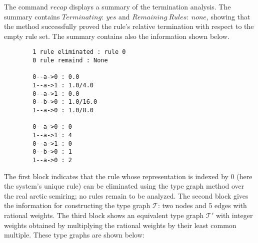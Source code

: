 The command \colorbox{Ivory2}{$recap$} displays a summary of the termination analysis. The summary contains \colorbox{Ivory2}{$Terminating:\ yes$} and \colorbox{Ivory2}{$Remaining\ Rules:\ none$}, showing that the method successfully proved the rule's relative termination with respect to the empty rule set.
The summary contains also the information shown below.
\begin{center}
    \begin{verbatim} 
        1 rule eliminated : rule 0 
        0 rule remaind : None

        0--a->0 : 0.0
        1--a->1 : 1.0/4.0 
        0--a->1 : 0.0
        0--b->0 : 1.0/16.0 
        1--a->0 : 1.0/8.0 

        0--a->0 : 0
        1--a->1 : 4
        0--a->1 : 0
        0--b->0 : 1
        1--a->0 : 2
    \end{verbatim}
\end{center}
The first block indicates that the rule whose representation is indexed by \colorbox{Ivory2}{0} (here the system's unique rule) can be eliminated using the type graph method over the real arctic semiring; no rules remain to be analyzed. The second block gives the information for constructing the type graph $\mathcal{T}$: two nodes and 5 edges with rational weights. The third block shows an equivalent type graph $\mathcal{T}'$ with integer weights obtained by multiplying the rational weights by their least common multiple. These type graphs are shown below:
